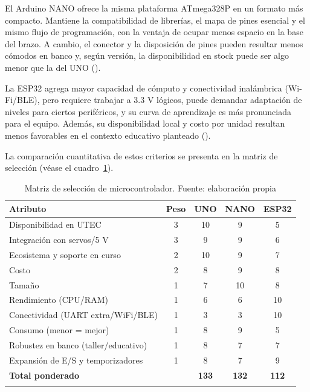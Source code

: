\vspace{1em}

El Arduino NANO ofrece la misma plataforma ATmega328P en un formato más compacto. Mantiene la compatibilidad de librerías, el mapa de pines esencial y el mismo flujo de programación, con la ventaja de ocupar menos espacio en la base del brazo. A cambio, el conector y la disposición de pines pueden resultar menos cómodos en banco y, según versión, la disponibilidad en stock puede ser algo menor que la del UNO (\cite{arduino_nano_specs}).

\vspace{1em}

La ESP32 agrega mayor capacidad de cómputo y conectividad inalámbrica (Wi-Fi/BLE), pero requiere trabajar a 3.3 V lógicos, puede demandar adaptación de niveles para ciertos periféricos, y su curva de aprendizaje es más pronunciada para el equipo. Además, su disponibilidad local y costo por unidad resultan menos favorables en el contexto educativo planteado (\cite{espressif_esp32_series_ds}).

La comparación cuantitativa de estos criterios se presenta en la matriz de selección (véase el cuadro~\ref{tab:matriz_micro}).

\begin{table}[H]
\centering
\caption{Matriz de selección de microcontrolador. Fuente: elaboración propia}
\begin{tabular}{lcccc}
\toprule
\textbf{Atributo} & \textbf{Peso} & \textbf{UNO} & \textbf{NANO} & \textbf{ESP32} \\
\midrule
Disponibilidad en UTEC                     & 3 & 10 & 9  & 5  \\
Integración con servos/5 V                 & 3 & 9  & 9  & 6  \\
Ecosistema y soporte en curso              & 2 & 10 & 9  & 7  \\
Costo                                      & 2 & 8  & 9  & 8  \\
Tamaño                                     & 1 & 7  & 10 & 8  \\
Rendimiento (CPU/RAM)                      & 1 & 6  & 6  & 10 \\
Conectividad (UART extra/WiFi/BLE)         & 1 & 3  & 3  & 10 \\
Consumo (menor = mejor)                    & 1 & 8  & 9  & 5  \\
Robustez en banco (taller/educativo)       & 1 & 8  & 7  & 7  \\
Expansión de E/S y temporizadores          & 1 & 8  & 7  & 9  \\
\midrule
\textbf{Total ponderado}                 &   & \textbf{133} & \textbf{132} & \textbf{112} \\
\bottomrule
\label{tab:matriz_micro}
\end{tabular}
\end{table}


